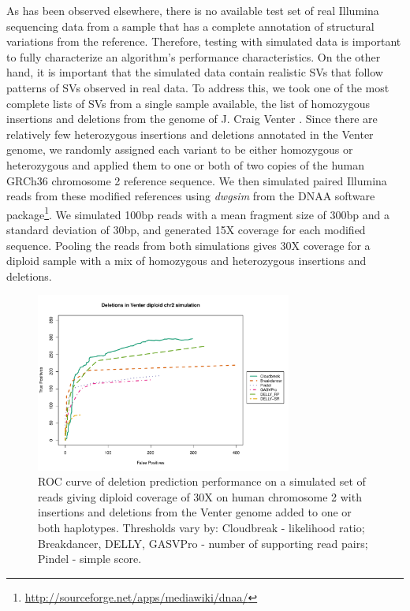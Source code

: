 \documentclass[11pt]{article}
\begin{document}
As has been observed elsewhere, there is no available test set of real Illumina sequencing data from a sample that has a complete annotation of structural variations from the reference. Therefore, testing with simulated data is important to fully characterize an algorithm's performance characteristics. On the other hand, it is important that the simulated data contain realistic SVs that follow patterns of SVs observed in real data. To address this, we took one of the most complete lists of SVs from a single sample available, the list of homozygous insertions and deletions from the genome of J. Craig Venter \autocite{Levy:2007fb}. Since there are relatively few heterozygous insertions and deletions annotated in the Venter genome, we randomly assigned each variant to be either homozygous or heterozygous and applied them to one or both of two copies of the human GRCh36 chromosome 2 reference sequence. We then simulated paired Illumina reads from these modified references using \emph{dwgsim} from the DNAA software package\footnote{\url{http://sourceforge.net/apps/mediawiki/dnaa/}}. We simulated 100bp reads with a mean fragment size of 300bp and a standard deviation of 30bp, and generated 15X coverage for each modified sequence. Pooling the reads from both simulations gives 30X coverage for a diploid sample with a mix of homozygous and heterozygous insertions and deletions.

\begin{figure}
\centering
\includegraphics[width=0.75\textwidth]{../figures/CHR2SIM_DELS_ROC.pdf}
\caption{ROC curve of deletion prediction performance on a simulated set of reads giving diploid coverage of 30X on human chromosome 2 with insertions and deletions from the Venter genome added to one or both haplotypes. Thresholds vary by: Cloudbreak - likelihood ratio; Breakdancer, DELLY, GASVPro - number of supporting read pairs; Pindel - simple score.}
\label{chr2DeletionsRoc}
\end{figure}
\end{document}

